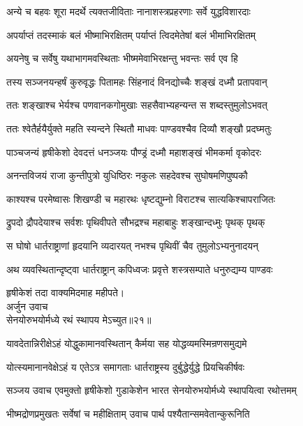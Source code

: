 \twolineshloka
{अन्ये च बहवः शूरा मदर्थे त्यक्तजीविताः}
{नानाशस्त्रप्रहरणाः सर्वे युद्धविशारदाः}%

\twolineshloka
{अपर्याप्तं तदस्माकं बलं भीष्माभिरक्षितम्}
{पर्याप्तं त्विदमेतेषां बलं भीमाभिरक्षितम्}%

\twolineshloka
{अयनेषु च सर्वेषु यथाभागमवस्थिताः}
{भीष्ममेवाभिरक्षन्तु भवन्तः सर्व एव हि}%

\twolineshloka
{तस्य सञ्जनयन्हर्षं कुरुवृद्धः पितामहः}
{सिंहनादं विनद्योच्चैः शङ्खं दध्मौ प्रतापवान्}%

\twolineshloka
{ततः शङ्खाश्च भेर्यश्च पणवानकगोमुखाः}
{सहसैवाभ्यहन्यन्त स शब्दस्तुमुलोऽभवत्}%

\twolineshloka
{ततः श्वेतैर्हयैर्युक्ते महति स्यन्दने स्थितौ}
{माधवः पाण्डवश्चैव दिव्यौ शङ्खौ प्रदघ्मतुः}%

\twolineshloka
{पाञ्चजन्यं हृषीकेशो देवदत्तं धनञ्जयः}
{पौण्ड्रं दध्मौ महाशङ्खं भीमकर्मा वृकोदरः}%

\twolineshloka
{अनन्तविजयं राजा कुन्तीपुत्रो युधिष्ठिरः}
{नकुलः सहदेवश्च सुघोषमणिपुष्पकौ}%

\twolineshloka
{काश्यश्च परमेष्वासः शिखण्डी च महारथः}
{धृष्टद्युम्नो विराटश्च सात्यकिश्चापराजितः}%

\twolineshloka
{द्रुपदो द्रौपदेयाश्च सर्वशः पृथिवीपते}
{सौभद्रश्च महाबाहुः शङ्खान्दध्मुः पृथक् पृथक्}%

\twolineshloka
{स घोषो धार्तराष्ट्राणां हृदयानि व्यदारयत्}
{नभश्च पृथिवीं चैव तुमुलोऽभ्यनुनादयन्}%

\twolineshloka
{अथ व्यवस्थितान्दृष्ट्वा धार्तराष्ट्रान् कपिध्वजः}
{प्रवृत्ते शस्त्रसम्पाते धनुरुद्यम्य पाण्डवः}%


{हृषीकेशं तदा वाक्यमिदमाह महीपते।}\\
{अर्जुन उवाच}\\
{सेनयोरुभयोर्मध्ये रथं स्थापय मेऽच्युत॥२१॥}\\%

\twolineshloka
{यावदेतान्निरीक्षेऽहं योद्धुकामानवस्थितान्}
{कैर्मया सह योद्धव्यमस्मिन्रणसमुद्यमे}%

\twolineshloka
{योत्स्यमानानवेक्षेऽहं य एतेऽत्र समागताः}
{धार्तराष्ट्रस्य दुर्बुद्धेर्युद्धे प्रियचिकीर्षवः}%

{सञ्जय उवाच}
\twolineshloka
{एवमुक्तो हृषीकेशो गुडाकेशेन भारत}
{सेनयोरुभयोर्मध्ये स्थापयित्वा रथोत्तमम्}%

\twolineshloka
{भीष्मद्रोणप्रमुखतः सर्वेषां च महीक्षिताम्}
{उवाच पार्थ पश्यैतान्समवेतान्कुरूनिति}%

